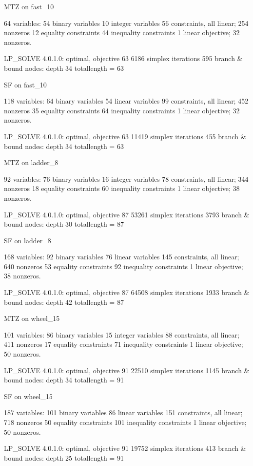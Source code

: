 \documentclass{article}
\begin{document}
MTZ on fast\_10

64 variables:
	54 binary variables
	10 integer variables
56 constraints, all linear; 254 nonzeros
	12 equality constraints
	44 inequality constraints
1 linear objective; 32 nonzeros.

LP_SOLVE 4.0.1.0: optimal, objective 63
6186 simplex iterations
595 branch \& bound nodes: depth 34
totallength = 63

SF on fast\_10

118 variables:
	64 binary variables
	54 linear variables
99 constraints, all linear; 452 nonzeros
	35 equality constraints
	64 inequality constraints
1 linear objective; 32 nonzeros.

LP_SOLVE 4.0.1.0: optimal, objective 63
11419 simplex iterations
455 branch \& bound nodes: depth 34
totallength = 63

MTZ on ladder\_8

92 variables:
	76 binary variables
	16 integer variables
78 constraints, all linear; 344 nonzeros
	18 equality constraints
	60 inequality constraints
1 linear objective; 38 nonzeros.

LP_SOLVE 4.0.1.0: optimal, objective 87
53261 simplex iterations
3793 branch \& bound nodes: depth 30
totallength = 87

SF on ladder\_8

168 variables:
	92 binary variables
	76 linear variables
145 constraints, all linear; 640 nonzeros
	53 equality constraints
	92 inequality constraints
1 linear objective; 38 nonzeros.

LP_SOLVE 4.0.1.0: optimal, objective 87
64508 simplex iterations
1933 branch \& bound nodes: depth 42
totallength = 87

MTZ on wheel\_15

101 variables:
	86 binary variables
	15 integer variables
88 constraints, all linear; 411 nonzeros
	17 equality constraints
	71 inequality constraints
1 linear objective; 50 nonzeros.

LP_SOLVE 4.0.1.0: optimal, objective 91
22510 simplex iterations
1145 branch \& bound nodes: depth 34
totallength = 91

SF on wheel\_15

187 variables:
	101 binary variables
	86 linear variables
151 constraints, all linear; 718 nonzeros
	50 equality constraints
	101 inequality constraints
1 linear objective; 50 nonzeros.

LP_SOLVE 4.0.1.0: optimal, objective 91
19752 simplex iterations
413 branch \& bound nodes: depth 25
totallength = 91
\end{document}
